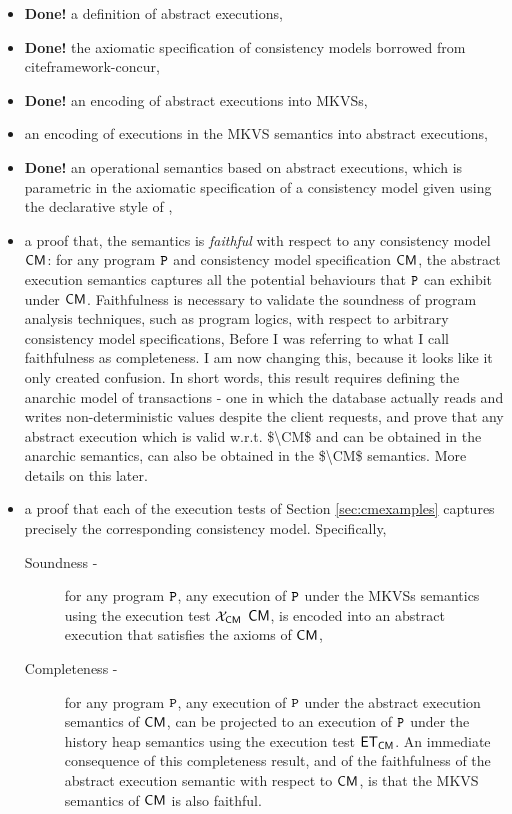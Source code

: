 \begin{itemize}
\item \textbf{Done!} a definition of abstract executions, 
\item \textbf{Done!} the axiomatic specification of consistency models borrowed from cite{framework-concur},
\item \textbf{Done!} an encoding of abstract executions into MKVSs, 
\item an encoding of executions in the MKVS semantics into abstract 
executions, 
\item \textbf{Done!} an operational semantics based on abstract executions, 
which is parametric in the axiomatic specification of a consistency model given using 
the declarative style of \cite{framework-concur,SIanalysis,laws}, 
\item a proof that, the semantics is \emph{faithful} with respect to any consistency model $\CM$: 
for any program $\texttt{P}$ and consistency model specification $\CM$, 
the abstract execution semantics captures all the potential behaviours that $\texttt{P}$ can 
exhibit under $\CM$. Faithfulness is necessary to validate the soundness of 
program analysis techniques, such as program logics, with respect to arbitrary consistency model 
specifications,
\ac{Before I was referring to what I call faithfulness as completeness. I am now changing this, because 
it looks like it only created confusion. In short words, this result requires defining the anarchic model 
of transactions - one in which the database actually reads and writes non-deterministic values 
despite the client requests, and prove that any abstract execution which is 
valid w.r.t. $\CM$ and can be obtained in the anarchic semantics, can also be obtained 
in the $\CM$ semantics. More details on this later.} 
\item a proof that each of the execution tests of Section \ref{sec:cmexamples}
captures precisely the corresponding consistency model. Specifically,
\begin{description}
\item[Soundness - ] for any program $\texttt{P}$, any execution of 
$\texttt{P}$ under the MKVSs semantics using the execution 
test $\mathcal{X}_{\mathsf{CM}}$ $\CM$, is encoded into an abstract execution 
that satisfies the axioms of $\CM$,
\item[Completeness - ] for any program $\texttt{P}$, any 
execution of $\texttt{P}$ under the abstract execution semantics of 
$\CM$, can be projected to an execution of $\texttt{P}$ under the history 
heap semantics using the execution test $\mathsf{ET}_{\mathsf{CM}}$. An immediate 
consequence of this completeness result, and of the faithfulness 
of the abstract execution semantic with respect to $\CM$, is that the MKVS semantics 
of $\CM$ is also faithful.
\end{description}
\end{itemize}

